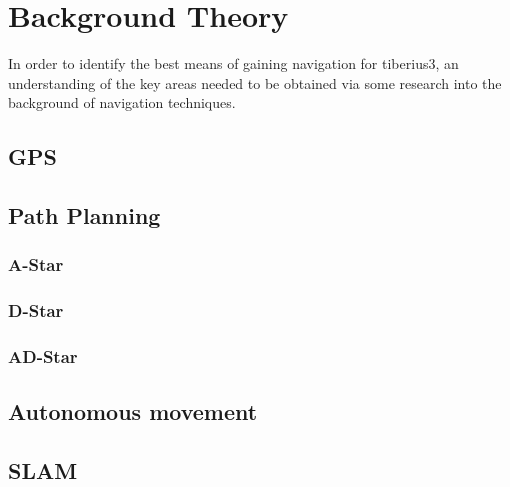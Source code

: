 \section{Background Theory}
In order to identify the best means of gaining navigation for \gls{tiberius3}, an understanding of the key areas needed to be obtained via some research into the background of navigation techniques.
\subsection{GPS}

\subsection{Path Planning}

\subsubsection{A-Star}

\subsubsection{D-Star}

\subsubsection{AD-Star}

\subsection{Autonomous movement}

\subsection{SLAM}